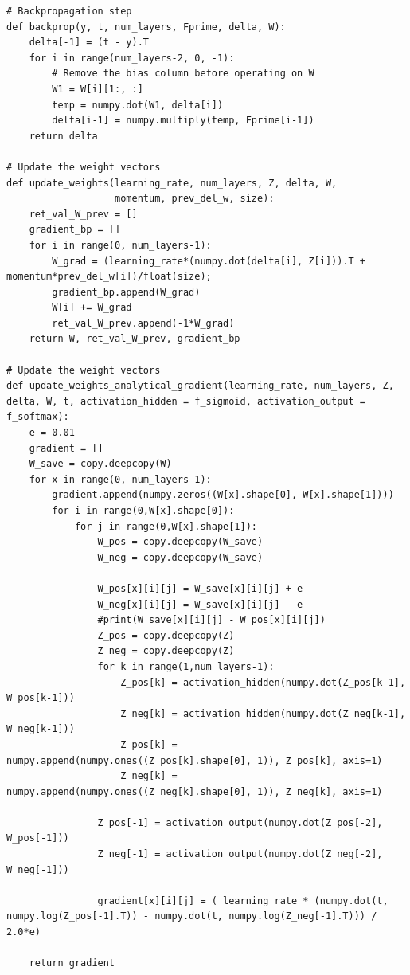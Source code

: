 \documentclass{article}
\begin{document}
\begin{lstlisting}
# Backpropagation step
def backprop(y, t, num_layers, Fprime, delta, W):
    delta[-1] = (t - y).T
    for i in range(num_layers-2, 0, -1):
        # Remove the bias column before operating on W
        W1 = W[i][1:, :]
        temp = numpy.dot(W1, delta[i])
        delta[i-1] = numpy.multiply(temp, Fprime[i-1])
    return delta

# Update the weight vectors
def update_weights(learning_rate, num_layers, Z, delta, W, 
                   momentum, prev_del_w, size):
    ret_val_W_prev = []
    gradient_bp = []
    for i in range(0, num_layers-1):
        W_grad = (learning_rate*(numpy.dot(delta[i], Z[i])).T + momentum*prev_del_w[i])/float(size);
        gradient_bp.append(W_grad)
        W[i] += W_grad
        ret_val_W_prev.append(-1*W_grad)
    return W, ret_val_W_prev, gradient_bp

# Update the weight vectors
def update_weights_analytical_gradient(learning_rate, num_layers, Z, delta, W, t, activation_hidden = f_sigmoid, activation_output = f_softmax):
    e = 0.01
    gradient = []
    W_save = copy.deepcopy(W)
    for x in range(0, num_layers-1):
        gradient.append(numpy.zeros((W[x].shape[0], W[x].shape[1])))
        for i in range(0,W[x].shape[0]):
            for j in range(0,W[x].shape[1]):
                W_pos = copy.deepcopy(W_save)
                W_neg = copy.deepcopy(W_save)
                
                W_pos[x][i][j] = W_save[x][i][j] + e
                W_neg[x][i][j] = W_save[x][i][j] - e
                #print(W_save[x][i][j] - W_pos[x][i][j])
                Z_pos = copy.deepcopy(Z)
                Z_neg = copy.deepcopy(Z)
                for k in range(1,num_layers-1):
                    Z_pos[k] = activation_hidden(numpy.dot(Z_pos[k-1], W_pos[k-1]))
                    Z_neg[k] = activation_hidden(numpy.dot(Z_neg[k-1], W_neg[k-1]))
                    Z_pos[k] = numpy.append(numpy.ones((Z_pos[k].shape[0], 1)), Z_pos[k], axis=1)
                    Z_neg[k] = numpy.append(numpy.ones((Z_neg[k].shape[0], 1)), Z_neg[k], axis=1)                    
        
                Z_pos[-1] = activation_output(numpy.dot(Z_pos[-2], W_pos[-1]))
                Z_neg[-1] = activation_output(numpy.dot(Z_neg[-2], W_neg[-1]))

                gradient[x][i][j] = ( learning_rate * (numpy.dot(t, numpy.log(Z_pos[-1].T)) - numpy.dot(t, numpy.log(Z_neg[-1].T))) / 2.0*e)                   
                
    return gradient
    

\end{lstlisting}
\end{document}
